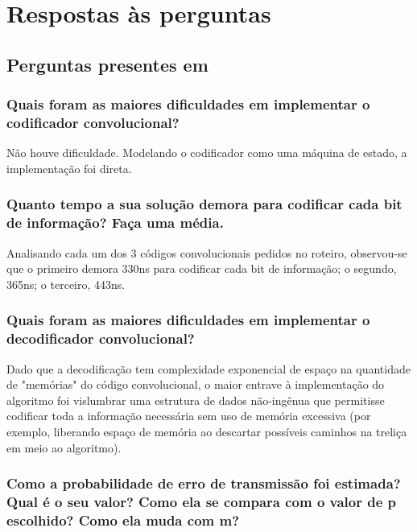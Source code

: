 \section{Respostas às perguntas}

\subsection{Perguntas presentes em \cite{ref:roteiro3}}

\subsubsection{Quais foram as maiores dificuldades em implementar o codificador convolucional?}

Não houve dificuldade. Modelando o codificador como uma máquina de estado, a implementação foi direta.

\subsubsection{Quanto tempo a sua solução demora para codificar cada bit de informação? Faça uma média.}

Analisando cada um dos 3 códigos convolucionais pedidos no roteiro, observou-se que o primeiro demora 330ns para codificar cada bit de informação; o segundo, 365ns; o terceiro, 443ns.

\subsubsection{Quais foram as maiores dificuldades em implementar o decodificador convolucional?}

Dado que a decodificação tem complexidade exponencial de espaço na quantidade de "memórias" do código convolucional, o maior entrave à implementação do algoritmo foi vislumbrar uma estrutura de dados não-ingênua que permitisse codificar toda a informação necessária sem uso de memória excessiva (por exemplo, liberando espaço de memória ao descartar possíveis caminhos na treliça em meio ao algoritmo).

\subsubsection{Como a probabilidade de erro de transmissão foi estimada? Qual é o seu valor? Como ela se
compara com o valor de p escolhido? Como ela muda com m?}

